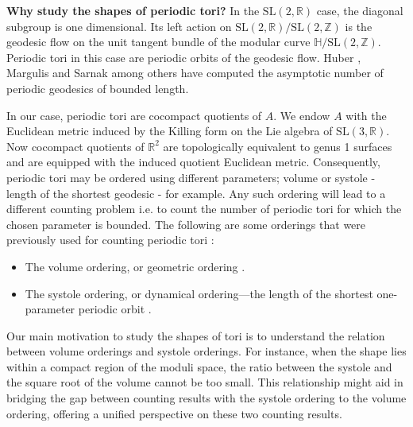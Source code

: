 \documentclass[11pt,letterpaper]{amsart}
\theoremstyle{definition}
\theoremstyle{remark}
\renewcommand{\rm}[1]{\mathrm{#1}}
\newcommand{\bb}[1]{\mathbb{#1}}
\newcommand{\R}{\bb R}
\newcommand{\Z}{\bb Z}
\newcommand{\SL}{\rm{SL}}
\newcommand{\nihar}{\color{red}}
\begin{document}
    
	
	
	\textbf{Why study the shapes of periodic tori?}
    In the $\SL(2,\mathbb{R})$ case, the diagonal subgroup is one dimensional.
    Its left action on $\SL(2,\mathbb{R})/\SL(2,\mathbb{Z})$ is the geodesic flow on the unit tangent bundle of the modular curve $\mathbb{H}/\SL(2,\Z)$. 
    Periodic tori in this case are periodic orbits of the geodesic flow.
	Huber \cite{huberZurAnalytischenTheorie1959}, Margulis \cite{margulisCertainApplicationsErgodic1969} and Sarnak \cite{sarnak1980} among others have computed the asymptotic number of periodic geodesics of bounded length. 
	
	
	In our case, periodic tori are cocompact quotients of $A$. %
{We endow $A$ with the Euclidean metric induced by the Killing form on the Lie algebra of $\SL(3,\R)$.
	Now cocompact quotients of $\R^2$ are topologically equivalent to genus 1 surfaces and are equipped with the induced quotient Euclidean metric.
	}
	Consequently, periodic tori may be ordered using different parameters;  volume or systole - length of the shortest geodesic - for example.
	Any such ordering will lead to a different counting problem i.e. to count the number of periodic tori for which the chosen parameter is bounded.
	The following are some orderings that were previously used for counting periodic tori :
	\begin{itemize}
	    \item The volume ordering, or geometric ordering  \cite{einsiedler_distribution_2009}.
	    \item The systole ordering, or dynamical ordering---the length of the shortest one-parameter periodic orbit \cite{spatzier83, deitmar,knieper2005uniqueness,dangEquidistributionCountingPeriodic2023,bonthonneau_srb_2021}.
	\end{itemize}
	
	
	
	
	Our main motivation to study the shapes of tori is to understand the relation between volume orderings and systole orderings. For instance, when the shape lies within a compact region of the moduli space, the ratio between the systole and the square root of the volume cannot be too small. This relationship might aid in bridging the gap between counting results with the systole ordering to the volume ordering, offering a unified perspective on these two counting results.
	
\end{document}
